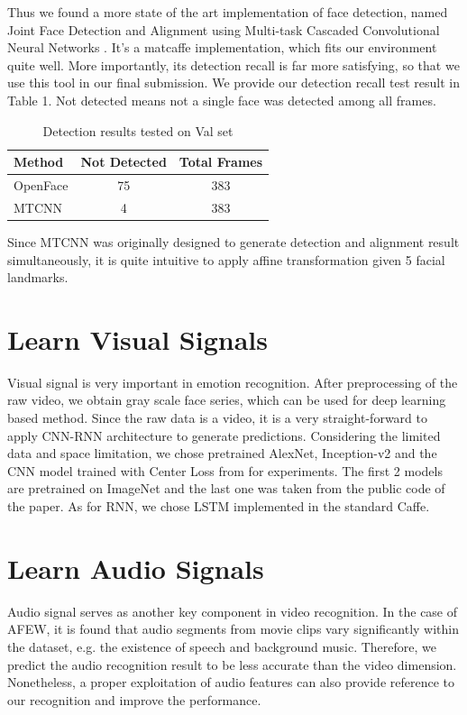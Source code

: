 \documentclass[10pt,twocolumn,letterpaper]{article}
\begin{document}
Thus we found a more state of the art implementation of face detection, named Joint Face Detection and Alignment using Multi-task Cascaded Convolutional Neural Networks \cite{7553523}. It's a matcaffe implementation, which fits our environment quite well. More importantly, its detection recall is far more satisfying, so that we use this tool in our final submission. We provide our detection recall test result in Table 1. Not detected means not a single face was detected among all frames. 

\begin{table}[htpb]
	\begin{center}
		\begin{tabular}{|l|c|c|}
			\hline
			Method & Not Detected & Total Frames\\
			\hline\hline
			OpenFace & 75 & 383\\
			\hline
			MTCNN & 4 & 383\\
			\hline
		\end{tabular}
	\end{center}
	\caption{Detection results tested on Val set}
\end{table}

Since MTCNN was originally designed to generate detection and alignment result simultaneously, it is quite intuitive to apply affine transformation given 5 facial landmarks.


\section{Learn Visual Signals}

Visual signal is very important in emotion recognition. After preprocessing of the raw video, we obtain gray scale face series, which can be used for deep learning based method. Since the raw data is a video, it is a very straight-forward to apply CNN-RNN architecture to generate predictions. Considering the limited data and space limitation, we chose pretrained AlexNet, Inception-v2 and the CNN model trained with Center Loss from \cite{wen2016discriminative} for experiments. The first 2 models are pretrained on ImageNet and the last one was taken from the public code of the paper. As for RNN, we chose LSTM implemented in the standard Caffe.

\section{Learn Audio Signals}

Audio signal serves as another key component in video recognition. In the case of AFEW, it is found that audio segments from movie clips vary significantly within the dataset, e.g. the existence of speech and background music. Therefore, we predict the audio recognition result to be less accurate than the video dimension. Nonetheless, a proper exploitation of audio features can also provide reference to our recognition and improve the performance.
\end{document}
